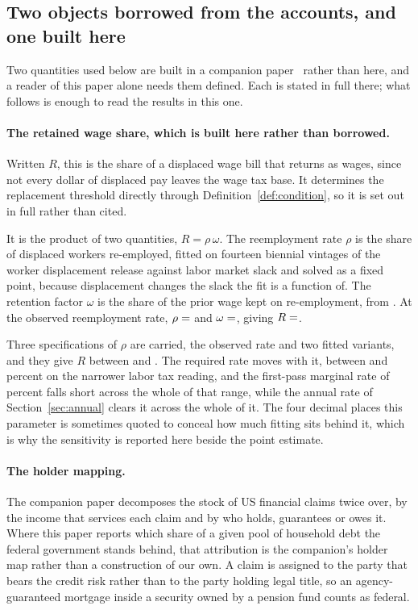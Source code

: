\subsection{Two objects borrowed from the accounts, and one built here}
\label{sec:borrowed}

Two quantities used below are built in a companion paper \companion\ rather than here, and a
reader of this paper alone needs them defined. Each is stated in full there; what follows is
enough to read the results in this one.

\paragraph{The retained wage share, which is built here rather than borrowed.} Written $R$, this
is the share of a displaced wage bill that returns as wages, since not every dollar of displaced
pay leaves the wage tax base. It determines the replacement threshold directly through
Definition~\ref{def:condition}, so it is set out in full rather than cited.

It is the product of two quantities, $R = \rho\,\omega$. The reemployment rate $\rho$ is the share
of displaced workers re-employed, fitted on fourteen biennial vintages of the worker displacement
release \citep{BLSWorkerDisplacement} against labor market slack and solved as a fixed point,
because displacement changes the slack the fit is a function of. The retention factor $\omega$ is
the share of the prior wage kept on re-employment, from \citet{Huckfeldt2022}. At the observed
reemployment rate, $\rho = \result{RhoReemploy}$ and $\omega = \result{OmegaWageKept}$, giving
$R = \result{RetainedWageShare}$.

Three specifications of $\rho$ are carried, the observed rate and two fitted variants, and they
give $R$ between  and . The required rate moves with it,
between  and  percent on the narrower labor tax reading,
and the first-pass marginal rate of  percent falls short across the whole of
that range, while the annual rate of Section~\ref{sec:annual} clears it across the whole of it. The four decimal places this parameter is sometimes quoted to conceal how much fitting
sits behind it, which is why the sensitivity is reported here beside the point estimate.

\paragraph{The holder mapping.} The companion paper decomposes the stock of US financial claims
twice over, by the income that services each claim and by who holds, guarantees or owes it. Where
this paper reports which share of a given pool of household debt the federal government stands
behind, that attribution is the companion's holder map rather than a construction of our own. A
claim is assigned to the party that bears the credit risk rather than to the party holding legal
title, so an agency-guaranteed mortgage inside a security owned by a pension fund counts as
federal.

